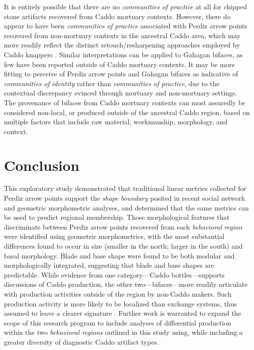 \documentclass[smallextended]{svjour3}       %
\begin{document}
It is entirely possible that there are no \emph{communities of practice}
at all for chipped stone artifacts recovered from Caddo mortuary
contexts. However, there do appear to have been \emph{communities of
practice} associated with Perdiz arrow points recovered from
non-mortuary contexts in the ancestral Caddo area, which may more
readily reflect the distinct retouch/resharpening approaches employed by
Caddo knappers \cite{RN9364}. Similar interpretations can be applied to
Gahagan bifaces, as few have been reported outside of Caddo mortuary
contexts. It may be more fitting to perceive of Perdiz arrow points and
Gahagan bifaces as indicative of \emph{communities of identity} rather
than \emph{communities of practice}, due to the contextual discrepancy
evinced through mortuary and non-mortuary settings. The provenance of
bifaces from Caddo mortuary contexts can most assuredly be considered
non-local, or produced outside of the ancestral Caddo region, based on
multiple factors that include raw material, workmanship, morphology, and
context.

\hypertarget{conclusion}{%
\section{Conclusion}\label{conclusion}}

This exploratory study demonstrated that traditional linear metrics
collected for Perdiz arrow points support the \emph{shape boundary}
posited in recent social network and geometric morphometric analyses,
and determined that the same metrics can be used to predict regional
membership. Those morphological features that discriminate between
Perdiz arrow points recovered from each \emph{behavioral region} were
identified using geometric morphometrics, with the most substantial
differences found to occur in size (smaller in the north; larger in the
south) and basal morphology. Blade and base shape were found to be both
modular and morphologically integrated, suggesting that blade and base
shapes are predictable. While evidence from one category---Caddo
bottles---supports discussions of Caddo production, the other
two---bifaces---more readily articulate with production activities
outside of the region by non-Caddo makers. Such production activity is
more likely to be localized than exchange systems, thus assumed to leave
a clearer signature \cite{RN7019}. Further work is warranted to expand
the scope of this research program to include analyses of differential
production within the two \emph{behavioral regions} outlined in this
study using, while including a greater diversity of diagnostic Caddo
artifact types.
\end{document}
